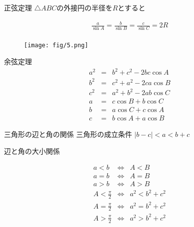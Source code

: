 \documentclass[aspectratio=169, 12pt]{beamer} %
\begin{document}
\begin{frame}{正弦定理}
    $\bigtriangleup ABC$の外接円の半径を$R$とすると\par
    \begin{eqnarray*}
        \frac{a}{\sin A}=\frac{b}{\sin B}=\frac{c}{\sin C}=2R \\
    \end{eqnarray*}
    \begin{figure}[htbp]
        \begin{center}
            \texttt{[image: fig/5.png]}
        \end{center}
    \end{figure}

\end{frame}
\begin{frame}{余弦定理}
    \begin{eqnarray*}
        a^2&=&b^2+c^2-2bc\cos A \\
        b^2&=&c^2+a^2-2ca\cos B \\
        c^2&=&a^2+b^2-2ab\cos C \\
        a&=&c\cos B+ b\cos C \\
        b&=&a\cos C+ c\cos A \\
        c&=&b\cos A+a\cos B
    \end{eqnarray*}
\end{frame}
\begin{frame}{三角形の辺と角の関係}
    三角形の成立条件 $|b-c|<a<b+c$ \par
    辺と角の大小関係 \par
    \begin{eqnarray*}
        a<b &\Leftrightarrow& A<B \\
        a=b &\Leftrightarrow& A=B \\
        a>b &\Leftrightarrow& A>B \\
        A<\frac{\pi}{2} &\Leftrightarrow& a^2<b^2+c^2 \\
        A=\frac{\pi}{2} &\Leftrightarrow& a^2=b^2+c^2 \\
        A>\frac{\pi}{2} &\Leftrightarrow& a^2>b^2+c^2 \\
    \end{eqnarray*}
\end{frame}
\end{document}
